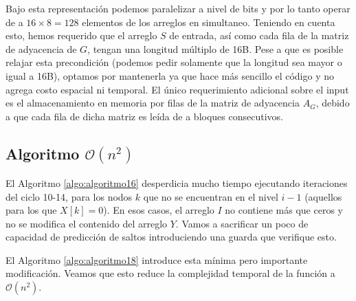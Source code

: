 Bajo esta representación podemos paralelizar a nivel de bits y por lo tanto operar de a $16 \times 8 = 128$ elementos de los arreglos en simultaneo. Teniendo en cuenta esto, hemos requerido que el arreglo $S$ de entrada, así como cada fila de la matriz de adyacencia de $G$, tengan una longitud múltiplo de 16B. Pese a que es posible relajar esta precondición (podemos pedir solamente que la longitud sea mayor o igual a 16B), optamos por mantenerla ya que hace más sencillo el código y no agrega costo espacial ni temporal. El único requerimiento adicional sobre el input es el almacenamiento en memoria por filas de la matriz de adyacencia $A_G$, debido a que cada fila de dicha matriz es leída de a bloques consecutivos.

\subsection{Algoritmo $\mathcal{O}(n^2)$}

El Algoritmo \ref{algo:algoritmo16} desperdicia mucho tiempo ejecutando iteraciones del ciclo 10-14, para los nodos $k$ que no se encuentran en el nivel $i - 1$ (aquellos para los que $X[k] = 0$). En esos casos, el arreglo $I$ no contiene más que ceros y no se modifica el contenido del arreglo $Y$. Vamos a sacrificar un poco de capacidad de predicción de saltos introduciendo una guarda que verifique esto.

\begin{algorithm}
	\DontPrintSemicolon
 	\BlankLine
\caption{$\textsc{Vectorized-BFS-Branching}$}
\label{algo:algoritmo18}
\end{algorithm}

El Algoritmo \ref{algo:algoritmo18} introduce esta mínima pero importante modificación. Veamos que esto reduce la complejidad temporal de la función a $\mathcal{O}(n^2)$.

